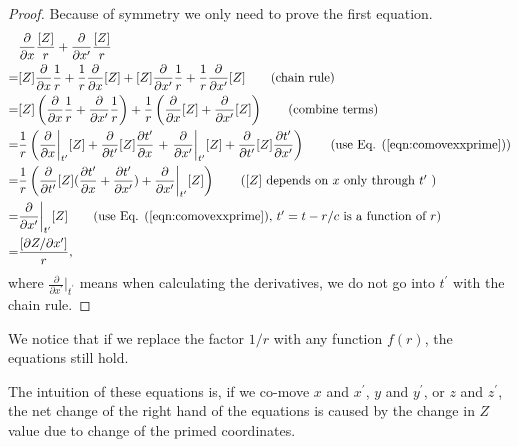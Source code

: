 \documentclass[11pt]{article}              %
\begin{document}
\begin{proof}
Because of symmetry we only need to prove the first equation.
\begin{align}
    &\frac{\partial}{\partial x}\frac{[Z]}{r}+\frac{\partial}{\partial x^\prime}\frac{[Z]}{r}\notag\\
    =&[Z]\frac{\partial}{\partial x}\frac{1}{r}+\frac{1}{r}\frac{\partial}{\partial x} [Z]+[Z]\frac{\partial}{\partial x^\prime}\frac{1}{r}+ \frac{1}{r}\frac{\partial}{\partial x^\prime} [Z]\tag{chain rule}\\
    =&[Z]\left(\frac{\partial}{\partial x}\frac{1}{r}+\frac{\partial}{\partial x^\prime}\frac{1}{r}\right)+\frac{1}{r}\left(\frac{\partial}{\partial x} [Z]+\frac{\partial}{\partial x^\prime} [Z]\right)\tag{combine terms}\\
    =&\frac{1}{r}\left(\frac{\partial}{\partial x}\bigg\rvert_{t^\prime} [Z]+\frac{\partial}{\partial t^\prime} [Z]\frac{\partial t^\prime}{\partial x}\right. +\left.\frac{\partial}{\partial x^\prime}\bigg\rvert_{t^\prime} [Z]+\frac{\partial}{\partial t^\prime} [Z]\frac{\partial t^\prime}{\partial x^\prime}\right)\tag{use Eq. (\ref{eqn:comovexxprime})}\\
    =&\frac{1}{r}\left(\frac{\partial}{\partial t^\prime} [Z](\frac{\partial t^\prime}{\partial x}+\frac{\partial t^\prime}{\partial x^\prime})+\frac{\partial}{\partial x^\prime}\bigg\rvert_{t^\prime} [Z]\right)\tag{$[Z]$ depends on $x$ only through $t^\prime$ }\\
    =&\frac{\partial}{\partial x^\prime}\bigg\rvert_{t^\prime} [Z]\tag{use Eq. (\ref{eqn:comovexxprime}), $t^\prime=t-r/c$ is a function of $r$}\\
    =&\frac{[\partial Z/ \partial x^\prime]}{r},\notag
\end{align}
where $\frac{\partial}{\partial x^\prime}|_{t^\prime}$ means when calculating the derivatives, we do not go into $t^\prime$ with the chain rule.
\end{proof}
We notice that if we replace the factor $1/r$ with any function $f(r)$, the equations still hold.

The intuition of these equations is, if we co-move $x$ and $x^\prime$, $y$ and $y^\prime$, or $z$ and $z^\prime$, the net change of the right hand of the equations is caused by the change in $Z$ value due to change of the primed coordinates.
\end{document}

